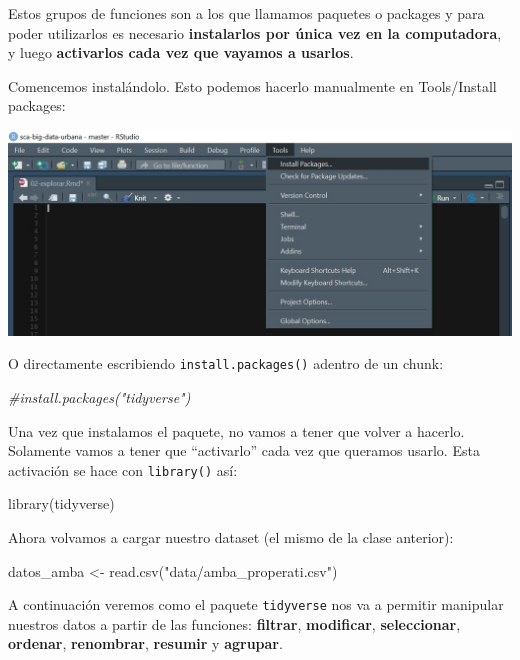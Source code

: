 \documentclass[
  spanish,
]{book}
\newenvironment{Shaded}{\begin{snugshade}}{\end{snugshade}}
\newcommand{\CommentTok}[1]{\textcolor[rgb]{0.56,0.35,0.01}{\textit{#1}}}
\newcommand{\FunctionTok}[1]{\textcolor[rgb]{0.00,0.00,0.00}{#1}}
\newcommand{\NormalTok}[1]{#1}
\newcommand{\OtherTok}[1]{\textcolor[rgb]{0.56,0.35,0.01}{#1}}
\newcommand{\StringTok}[1]{\textcolor[rgb]{0.31,0.60,0.02}{#1}}
\begin{document}
Estos grupos de funciones son a los que llamamos paquetes o packages y para poder utilizarlos es necesario \textbf{instalarlos por única vez en la computadora}, y luego \textbf{activarlos cada vez que vayamos a usarlos}.

Comencemos instalándolo. Esto podemos hacerlo manualmente en Tools/Install packages:

\includegraphics{images/005.jpg}

O directamente escribiendo \texttt{install.packages()} adentro de un chunk:

\begin{Shaded}
\begin{Highlighting}[]
\CommentTok{\#install.packages("tidyverse")}
\end{Highlighting}
\end{Shaded}

Una vez que instalamos el paquete, no vamos a tener que volver a hacerlo. Solamente vamos a tener que ``activarlo'' cada vez que queramos usarlo. Esta activación se hace con \texttt{library()} así:

\begin{Shaded}
\begin{Highlighting}[]
\FunctionTok{library}\NormalTok{(tidyverse)}
\end{Highlighting}
\end{Shaded}

Ahora volvamos a cargar nuestro dataset (el mismo de la clase anterior):

\begin{Shaded}
\begin{Highlighting}[]
\NormalTok{datos\_amba }\OtherTok{\textless{}{-}} \FunctionTok{read.csv}\NormalTok{(}\StringTok{"data/amba\_properati.csv"}\NormalTok{)}
\end{Highlighting}
\end{Shaded}

A continuación veremos como el paquete \texttt{tidyverse} nos va a permitir manipular nuestros datos a partir de las funciones: \textbf{filtrar}, \textbf{modificar}, \textbf{seleccionar}, \textbf{ordenar}, \textbf{renombrar}, \textbf{resumir} y \textbf{agrupar}.
\end{document}
